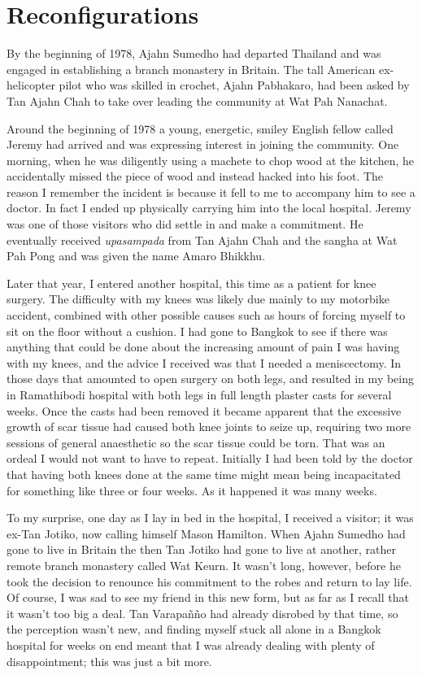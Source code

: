 \chapter{Reconfigurations}

By the beginning of 1978, Ajahn Sumedho had departed Thailand and was
engaged in establishing a branch monastery in Britain. The tall American
ex-helicopter pilot who was skilled in crochet, Ajahn Pabhakaro, had
been asked by Tan Ajahn Chah to take over leading the community at Wat
Pah Nanachat.

Around the beginning of 1978 a young, energetic, smiley English fellow
called Jeremy had arrived and was expressing interest in joining the
community. One morning, when he was diligently using a machete to chop
wood at the kitchen, he accidentally missed the piece of wood and
instead hacked into his foot. The reason I remember the incident is
because it fell to me to accompany him to see a doctor. In fact I ended
up physically carrying him into the local hospital. Jeremy was one of
those visitors who did settle in and make a commitment. He eventually
received \emph{upasampada} from Tan Ajahn Chah and the sangha at Wat Pah
Pong and was given the name Amaro Bhikkhu.

Later that year, I entered another hospital, this time as a patient for knee
surgery. The difficulty with my knees was likely due mainly to my motorbike
accident, combined with other possible causes such as hours of forcing myself to
sit on the floor without a cushion.
I had gone to Bangkok to see if there was anything that could
be done about the increasing amount of pain I was having with my knees,
and the advice I received was that I needed a meniscectomy. In those
days that amounted to open surgery on both legs, and resulted in my
being in Ramathibodi hospital with both legs in full length plaster
casts for several weeks. Once the casts had been removed it became
apparent that the excessive growth of scar tissue had caused both knee
joints to seize up, requiring two more sessions of general anaesthetic
so the scar tissue could be torn. That was an ordeal I would not want to
have to repeat. Initially I had been told by the doctor that having both
knees done at the same time might mean being incapacitated for something
like three or four weeks. As it happened it was many weeks.

To my surprise, one day as I lay in bed in the hospital, I received a
visitor; it was ex-Tan Jotiko, now calling himself Mason Hamilton. When
Ajahn Sumedho had gone to live in Britain the then Tan Jotiko had gone to live
at another, rather remote branch monastery called Wat Keurn. It wasn't
long, however, before he took the decision to renounce his commitment to
the robes and return to lay life. Of course, I was sad to see my friend
in this new form, but as far as I recall that it wasn't too big a deal.
Tan Varapañño had already disrobed by that time, so the perception
wasn't new, and finding myself stuck all alone in a Bangkok hospital for
weeks on end meant that I was already dealing with plenty of
disappointment; this was just a bit more.

